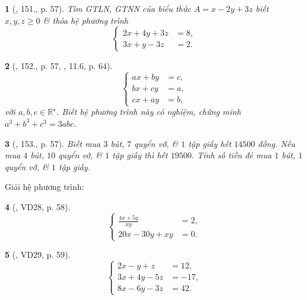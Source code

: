 \documentclass{article}
\newtheorem{baitoan}{}
\begin{document}
\begin{baitoan}[\cite{Tuyen_Toan_9_old}, 151., p. 57]
	Tìm {\rm GTLN, GTNN} của biểu thức $A = x - 2y + 3z$ biết $x,y,z\ge0$ \& thỏa hệ phương trình
	\begin{equation*}
		\left\{\begin{split}
			2x + 4y + 3z &= 8,\\
			3x + y - 3z &= 2.
		\end{split}\right.
	\end{equation*}
\end{baitoan}

\begin{baitoan}[\cite{Tuyen_Toan_9_old}, 152., p. 57, \cite{TLCT_THCS_Toan_9_dai_so}, 11.6, p. 64]
	\begin{equation*}
		\left\{\begin{split}
			ax + by &= c,\\
			bx + cy &= a,\\
			cx + ay &= b,
		\end{split}\right.
	\end{equation*}
	với $a,b,c\in\mathbb{R}^\star$. Biết hệ phương trình này có nghiệm, chứng minh $a^3 + b^3 + c^3 = 3abc$.
\end{baitoan}

\begin{baitoan}[\cite{Tuyen_Toan_9_old}, 153., p. 57]
	Biết mua $3$ bút, $7$ quyển vở, \& $1$ tập giấy hết $14500$ đồng. Nếu mua $4$ bút, $10$ quyển vở, \& $1$ tập giấy thì hết $19500$. Tính số tiền đẻ mua $1$ bút, $1$ quyển vở, \& $1$ tập giấy.
\end{baitoan}
Giải hệ phương trình:

\begin{baitoan}[\cite{Tuyen_Toan_9_old}, VD28, p. 58]
	\begin{equation*}
		\left\{\begin{split}
			\frac{4x + 5y}{xy} &= 2,\\
			20x - 30y + xy &= 0.
		\end{split}\right.
	\end{equation*}
\end{baitoan}

\begin{baitoan}[\cite{Tuyen_Toan_9_old}, VD29, p. 59]
	\begin{equation*}
		\left\{\begin{split}
			2x - y + z &= 12,\\
			3x + 4y - 5z &= -17,\\
			8x - 6y - 3z &= 42.
		\end{split}\right.
	\end{equation*}
\end{baitoan}
\end{document}
